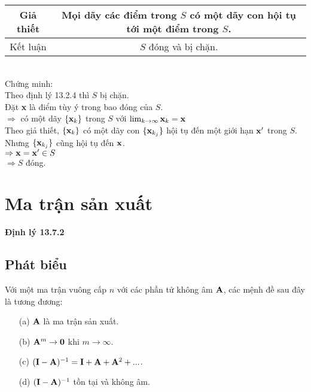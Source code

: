 \documentclass[12pt]{article}
\begin{document}
                        \begin{tabular}{c | c}
                            Giả thiết  & Mọi dãy các điểm trong $S$ có một dãy con hội tụ tới một điểm trong $S$.\\
                            \hline 
                            Kết luận & $S$ đóng và bị chặn.
                        \end{tabular}\\

                        Chứng minh:\\
                        Theo định lý 13.2.4 thì $S$ bị chặn.\\
                        Đặt {\bf x} là điểm tùy ý trong bao đóng của $S$.\\
                        $\Rightarrow$ có một dãy $\{{\bf x}_k\}$ trong $S$ với $\lim_{k \to \infty } {\bf x}_k = {\bf x}$\\
                        Theo giả thiết, $\{{\bf x}_k\}$ có một dãy con $\{{\bf x}_{k_j}\}$ hội tụ đến một giới hạn ${\bf x'}$ trong $S$.\\
                        Nhưng  $\{{\bf x}_{k_j}\}$ cũng hội tụ đến ${\bf x}$.\\
                        $\Rightarrow {\bf x} = {\bf x'} \in S$\\
                        $\Rightarrow S$ đóng.
        \section{Ma trận sản xuất}
            {\bf Định lý 13.7.2}
            \subsection{Phát biểu}
                Với một ma trận vuông cấp $n$ với các phần tử không âm ${\bf A}$, các mệnh đề sau đây là tương đương:
                \begin{itemize}
                    \item [(a)] ${\bf A}$ là ma trận sản xuất.
                    \item [(b)] ${\bf A}^m \to {\bf 0}$ khi $m \to \infty$.
                    \item [(c)] $({\bf I - A})^{-1} = {\bf I} + {\bf A} + {\bf A}^2 + ... $.
                    \item [(d)] $({\bf I - A})^{-1}$ tồn tại và không âm.
                \end{itemize} 
\end{document}
